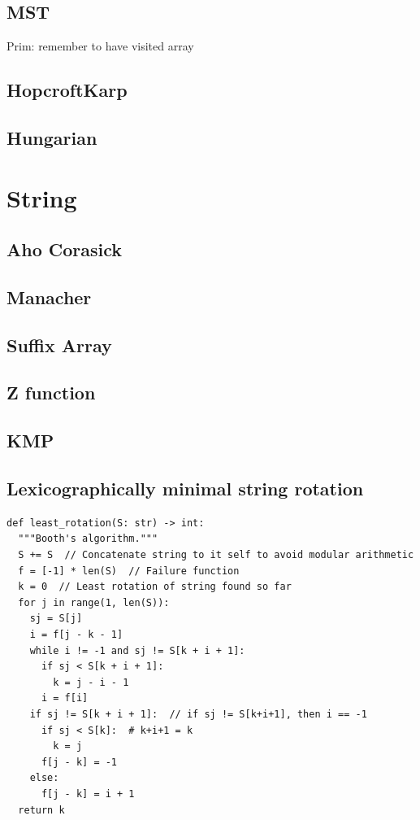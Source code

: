 \documentclass[A4 paper, 12pt, oneside, landscape]{article}
\begin{document}
\begin{multicols}{2}
	\subsection{MST}
	Prim: remember to have visited array
	
	\subsection{HopcroftKarp}
	
	
	\subsection{Hungarian}
	
	
\section{String}
	\subsection{Aho Corasick}
	
	
	\subsection{Manacher}
	
	
	\subsection{Suffix Array}
	
	
	\subsection{Z function}
	
	
	\subsection{KMP}
	
	
	\subsection{Lexicographically minimal string rotation}
	\begin{lstlisting}
def least_rotation(S: str) -> int:
  """Booth's algorithm."""
  S += S  // Concatenate string to it self to avoid modular arithmetic
  f = [-1] * len(S)  // Failure function
  k = 0  // Least rotation of string found so far
  for j in range(1, len(S)):
    sj = S[j]
    i = f[j - k - 1]
    while i != -1 and sj != S[k + i + 1]:
      if sj < S[k + i + 1]:
        k = j - i - 1
      i = f[i]
    if sj != S[k + i + 1]:  // if sj != S[k+i+1], then i == -1
      if sj < S[k]:  # k+i+1 = k
        k = j
      f[j - k] = -1
    else:
      f[j - k] = i + 1
  return k
	\end{lstlisting}
	

\end{multicols}
\end{document}
